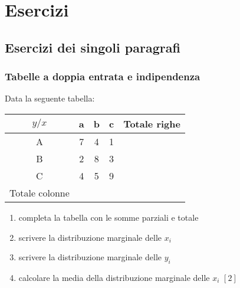 \begin{comment}

\begin{esercizio}
\label{ese:c_stat_}
\end{esercizio}

\end{comment}

\section{Esercizi}

\subsection{Esercizi dei singoli paragrafi}


\subsubsection{Tabelle a doppia entrata e indipendenza}

\begin{esercizio}
\label{ese:c_stat_001}
Data la seguente tabella:
\begin{center}
\setlength{\tabcolsep}{.8cm}
\begin{tabular}{|c|c|c|c|c|}
\hline
$y/x$ & a & b & c & Totale righe\\
\hline
A & 7 & 4 & 1 & \\
\hline
B & 2 & 8 & 3 & \\
\hline
C & 4 & 5 & 9 & \\
\hline
Totale colonne & & & & \\
\hline
\end{tabular}
\end{center}

\begin{enumerate}
\item completa la tabella con le somme parziali e totale
\item scrivere la distribuzione marginale delle $x_i$
\item scrivere la distribuzione marginale delle $y_i$
\item calcolare la media della distribuzione marginale delle $x_i$ 
\hfill $[2]$
\end{enumerate}
\end{esercizio}

